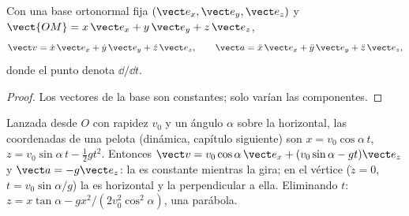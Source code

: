 \begin{proposition}\label{prop:b1:point-kinematics:cartesian}
Con una base ortonormal fija $(\vect e_x, \vect e_y, \vect e_z)$ y
$\vect{OM} = x\,\vect e_x + y\,\vect e_y + z\,\vect e_z$,
\[
\vect v = \dot x\,\vect e_x + \dot y\,\vect e_y + \dot z\,\vect e_z, \qquad
\vect a = \ddot x\,\vect e_x + \ddot y\,\vect e_y + \ddot z\,\vect e_z,
\]
donde el punto denota $\dd/\dd t$.
\end{proposition}

\begin{proof}
Los vectores de la base son constantes; solo varían las componentes.
\end{proof}

\begin{example}[Proyectil]\label{ex:b1:point-kinematics:projectile}
Lanzada desde $O$ con rapidez $v_0$ y un ángulo $\alpha$ sobre la
horizontal, las coordenadas de una pelota (dinámica, capítulo siguiente)
son $x = v_0\cos\alpha\,t$, $z = v_0\sin\alpha\,t - \tfrac12 gt^2$.
Entonces $\vect v = v_0\cos\alpha\,\vect e_x + (v_0\sin\alpha - gt)\vect e_z$
y $\vect a = -g\vect e_z$: la  es constante mientras la
 gira; en el vértice ($\dot z = 0$, $t = v_0\sin\alpha/g$) la
 es horizontal y la  perpendicular a ella. Eliminando
$t$: $z = x\tan\alpha - gx^2/(2v_0^2\cos^2\alpha)$, una parábola.
\end{example}

